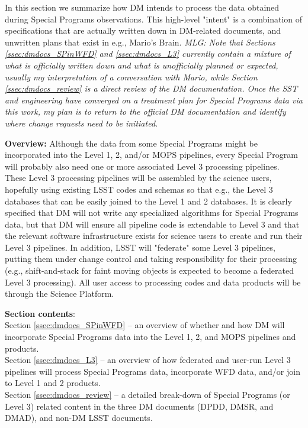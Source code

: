 \documentclass[DM,lsstdraft,toc]{lsstdoc}
\begin{document}
In this section we summarize how DM intends to process the data obtained during Special Programs observations. This high-level "intent" is a combination of specifications that are actually written down in DM-related documents, and unwritten plans that exist in e.g., Mario's Brain. {\it MLG: Note that Sections \ref{ssec:dmdocs_SPinWFD} and \ref{ssec:dmdocs_L3} currently contain a mixture of what is officially written down and what is unofficially planned or expected, usually my interpretation of a conversation with Mario, while Section \ref{ssec:dmdocs_review} is a direct review of the DM documentation. Once the SST and engineering have converged on a treatment plan for Special Programs data via this work, my plan is to return to the official DM documentation and identify where change requests need to be initiated.}

\textbf{Overview:} Although the data from some Special Programs might be incorporated into the Level 1, 2, and/or MOPS pipelines, every Special Program will probably also need one or more associated Level 3 processing pipelines. These Level 3 processing pipelines will be assembled by the science users, hopefully using existing LSST codes and schemas so that e.g., the Level 3 databases that can be easily joined to the Level 1 and 2 databases. It is clearly specified that DM will not write any specialized algorithms for Special Programs data, but that DM will ensure all pipeline code is extendable to Level 3 and that the relevant software infrastructure exists for science users to create and run their Level 3 pipelines. In addition, LSST will "federate" some Level 3 pipelines, putting them under change control and taking responsibility for their processing (e.g., shift-and-stack for faint moving objects is expected to become a federated Level 3 processing). All user access to processing codes and data products will be through the Science Platform. 

\textbf{Section contents}: \\
Section \ref{ssec:dmdocs_SPinWFD} -- an overview of whether and how DM will incorporate Special Programs data into the Level 1, 2, and MOPS pipelines and products. \\
Section \ref{ssec:dmdocs_L3} -- an overview of how federated and user-run Level 3 pipelines will process Special Programs data, incorporate WFD data, and/or join to Level 1 and 2 products. \\
Section \ref{ssec:dmdocs_review} -- a detailed break-down of Special Programs (or Level 3) related content in the three DM documents (DPDD, DMSR, and DMAD), and non-DM LSST documents. \\
\end{document}
